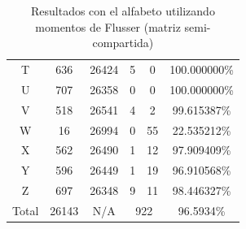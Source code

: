 \documentclass[a4paper, 11pt, oneside]{report}
\begin{document}
\begin{table}
\begin{tabular}{|c|c|c|c|c|c|}
	T & 636 & 26424 & 5 & 0 & 100.000000\% \\ 
	U & 707 & 26358 & 0 & 0 & 100.000000\% \\ 
	V & 518 & 26541 & 4 & 2 & 99.615387\% \\ 
	W & 16 & 26994 & 0 & 55 & 22.535212\% \\ 
	X & 562 & 26490 & 1 & 12 & 97.909409\% \\ 
	Y & 596 & 26449 & 1 & 19 & 96.910568\% \\ 
	Z & 697 & 26348 & 9 & 11 & 98.446327\% \\ 
	\hline
	Total & 26143 & N/A & \multicolumn{2}{|c|}{922} & 96.5934\% \\
	\hline
\end{tabular}
\caption{Resultados con el alfabeto utilizando momentos de Flusser (matriz semi-compartida)}
\label{tb:alphaFlShared}
\end{table}
\end{document}
